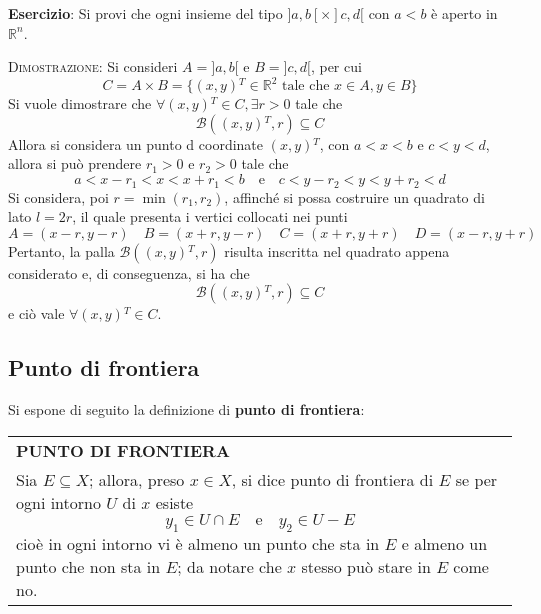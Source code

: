 \documentclass[a4paper]{extarticle}
\renewcommand\arraystretch{}
\begin{document}
\vspace{2em}
\noindent
\textbf{Esercizio}: Si provi che ogni insieme del tipo $]a,b[ \times ]c,d[$ con $a<b$ è aperto in $\mathbb{R}^n$.

\vspace{2em}
\noindent
\normalfont \normalsize
\textsc{Dimostrazione}: Si consideri $A=]a,b[$ e $B=]c,d[$, per cui
\[C=A \times B = \{(x,y){^T} \in \mathbb{R}^2 \text{ tale che } x \in A, y \in B\}\]
Si vuole dimostrare che $\forall (x,y){^T} \in C, \exists r > 0$ tale che
\[\mathcal{B} \left((x,y){^T}, r\right) \subseteq C\]
Allora si considera un punto d coordinate $(x,y){^T}$, con $a<x<b$ e $c<y<d$, allora si può prendere $r_1>0$ e $r_2>0$ tale che
\[a < x-r_1 < x < x+r_1 < b \hspace{1em} \text{e} \hspace{1em} c < y-r_2 < y < y+r_2 < d\]
Si considera, poi $r = \min(r_1,r_2)$, affinché si possa costruire un quadrato di lato $l=2r$, il quale presenta i vertici collocati nei punti
\[A=(x-r,y-r) \hspace{1em} B=(x+r,y-r) \hspace{1em} C=(x+r,y+r) \hspace{1em} D=(x-r,y+r)\]
Pertanto, la palla $\mathcal{B}((x,y){^T},r)$ risulta inscritta nel quadrato appena considerato e, di conseguenza, si ha che
\[\mathcal{B}((x,y){^T},r) \subseteq C\]
e ciò vale $\forall (x,y){^T} \in C$.

\vspace{1em}
\noindent
\subsection{Punto di frontiera}
Si espone di seguito la definizione di \textbf{punto di frontiera}:

\vspace{1em}
\setlength{\tabcolsep}{14pt}
\renewcommand{\arraystretch}{2}
\noindent
\begin{tabularx}{\textwidth}{@{}|P|@{}}
    \hline
    {\textbf{PUNTO DI FRONTIERA}}\\
    \parbox{\linewidth}{Sia $E \subseteq X$; allora, preso $x \in X$, si dice punto di frontiera di $E$ se per ogni intorno $U$ di $x$ esiste
    \[y_1 \in U \cap E \hspace{1em} \text{e} \hspace{1em} y_2 \in U - E\]
    cioè in ogni intorno vi è almeno un punto che sta in $E$ e almeno un punto che non sta in $E$; da notare che $x$ stesso può stare in $E$ come no.
    \vspace{3mm}}\\
    \hline
\end{tabularx}
\end{document}
